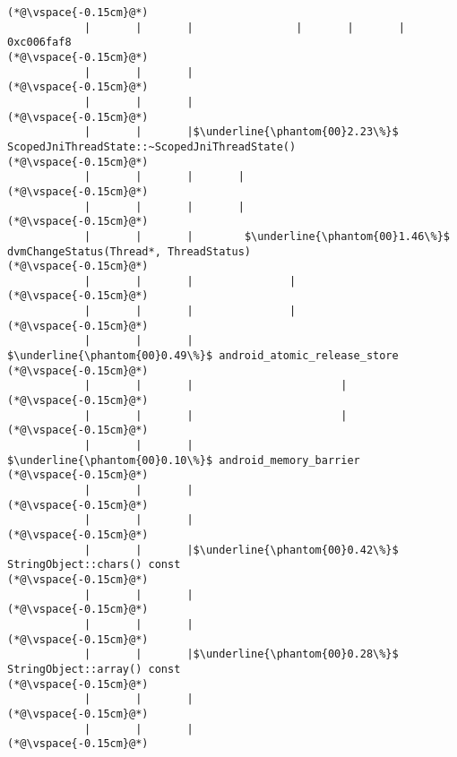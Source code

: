 \begin{lstlisting}[caption=Unicode-merkkijonon osoitinoperaatio, label=profile:C2JReadUnicode-512, numberbychapter=true, frame=lines, float, floatplacement=t]
(*@\vspace{-0.15cm}@*)
            |       |       |                |       |       |               0xc006faf8
(*@\vspace{-0.15cm}@*)
            |       |       |
(*@\vspace{-0.15cm}@*)
            |       |       |
(*@\vspace{-0.15cm}@*)
            |       |       |$\underline{\phantom{00}2.23\%}$ ScopedJniThreadState::~ScopedJniThreadState()
(*@\vspace{-0.15cm}@*)
            |       |       |       |
(*@\vspace{-0.15cm}@*)
            |       |       |       |
(*@\vspace{-0.15cm}@*)
            |       |       |        $\underline{\phantom{00}1.46\%}$ dvmChangeStatus(Thread*, ThreadStatus)
(*@\vspace{-0.15cm}@*)
            |       |       |               |
(*@\vspace{-0.15cm}@*)
            |       |       |               |
(*@\vspace{-0.15cm}@*)
            |       |       |                $\underline{\phantom{00}0.49\%}$ android_atomic_release_store
(*@\vspace{-0.15cm}@*)
            |       |       |                       |
(*@\vspace{-0.15cm}@*)
            |       |       |                       |
(*@\vspace{-0.15cm}@*)
            |       |       |                        $\underline{\phantom{00}0.10\%}$ android_memory_barrier
(*@\vspace{-0.15cm}@*)
            |       |       |
(*@\vspace{-0.15cm}@*)
            |       |       |
(*@\vspace{-0.15cm}@*)
            |       |       |$\underline{\phantom{00}0.42\%}$ StringObject::chars() const
(*@\vspace{-0.15cm}@*)
            |       |       |
(*@\vspace{-0.15cm}@*)
            |       |       |
(*@\vspace{-0.15cm}@*)
            |       |       |$\underline{\phantom{00}0.28\%}$ StringObject::array() const
(*@\vspace{-0.15cm}@*)
            |       |       |
(*@\vspace{-0.15cm}@*)
            |       |       |
(*@\vspace{-0.15cm}@*)

\end{lstlisting}

